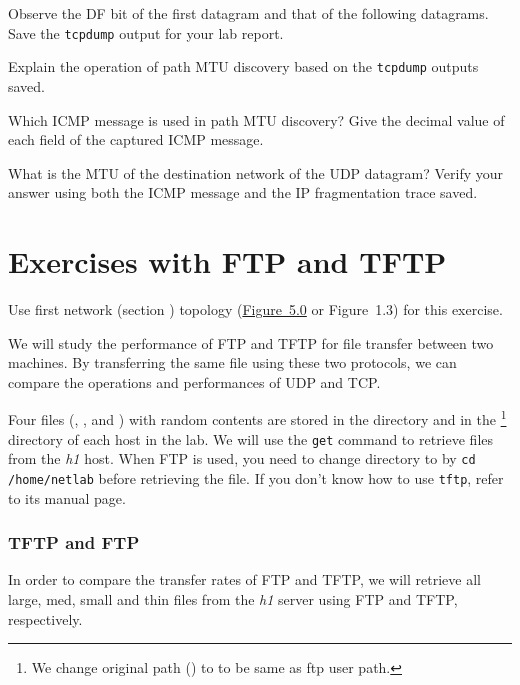 \documentclass{../UTNetLab}
\begin{document}
    Observe the DF bit of the first datagram and that of the following datagrams.
    Save the \lstinline{tcpdump} output for your lab report.

    \begin{report}
        \item Explain the operation of path MTU discovery based on the \lstinline{tcpdump} outputs saved.
        
        \item Which ICMP message is used in path MTU discovery? Give the decimal value of each field of the captured ICMP message.
        
        \item What is the MTU of the destination network of the UDP datagram? Verify your answer using both the ICMP message and the IP fragmentation trace saved.
    \end{report}

\part{Exercises with FTP and TFTP}
    Use first network (section ) topology (\hyperref[fig:5.0]{Figure~5.0} or Figure~1.3) for this exercise.

    We will study the performance of FTP and TFTP for file transfer between two machines.
    By transferring the same file using these two protocols, we can compare the operations and performances of UDP and TCP.

    Four files (, ,  and ) with random contents are stored in the  directory and in the \footnote{We change original path () to  to be same as ftp user path.} directory of each host in the lab.
    We will use the \lstinline{get} command to retrieve files from the \textit{h1} host.
    When FTP is used, you need to change directory to  by \lstinline{cd /home/netlab} before retrieving the file.
    If you don’t know how to use \lstinline{tftp}, refer to its manual page.


\section{TFTP and FTP}
    In order to compare the transfer rates of FTP and TFTP, we will retrieve all large, med, small and thin files from the \textit{h1} server using FTP and TFTP, respectively.
\end{document}
